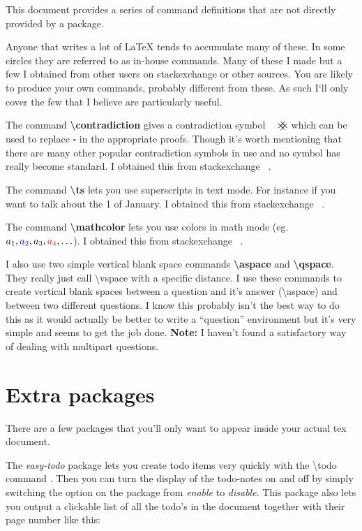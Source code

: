     This document provides a series of command definitions that are not directly provided by a package.

    Anyone that writes a lot of \LaTeX{} tends to accumulate many of these. In some circles they are referred to as in-house commands. Many of these I made but a few I obtained from other users on stackexchange or other sources. You are likely to produce your own commands, probably different from these. As such I`ll only cover the few that I believe are particularly useful.

    The command \textbf{\textbackslash contradiction} gives a contradiction symbol $\contradiction$ which can be used to replace $\square$ in the appropriate proofs. Though it's worth mentioning that there are many other popular contradiction symbols in use and no symbol has really become standard. I obtained this from stackexchange ~\cite{contradiction}.

    The command \textbf{\textbackslash ts} lets you use superscripts in text mode. For instance if you want to talk about the 1 of January. I obtained this from stackexchange ~\cite{textsup}.

    The command \textbf{\textbackslash mathcolor} lets you use colors in math mode (eg. $a_1,\mathcolor{blue}{a_2},a_3,\mathcolor{red}{a_4},\ldots$). I obtained this from stackexchange ~\cite{mathcolor}.

    I also use two simple vertical blank space commands \textbf{\textbackslash aspace} and \textbf{\textbackslash qspace}. They really just call \textbackslash vspace with a specific distance. I use these commands to create vertical blank spaces between a question and it's answer (\textbackslash aspace) and between two different questions. I know this probably isn't the best way to do this as it would actually be better to write a ``question'' environment but it's very simple and seems to get the job done. \textbf{Note:} I haven't found a satisfactory way of dealing with multipart questions.

  \section{Extra packages}
    There are a few packages that you'll only want to appear inside your actual tex document.
    
    The \textit{easy-todo} package lets you create todo items very quickly with the \textbackslash todo command . Then you can turn the display of the todo-notes on and off by simply switching the option on the package from \textit{enable} to \textit{disable}. This package also lets you output a clickable list of all the todo's in the document together with their page number like this:

